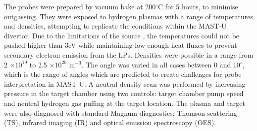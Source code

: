 \documentclass[a4paper, 12pt]{article} %
\begin{document}
	The probes were prepared by vacuum bake at 200$^{\circ}$C for 5 hours, to minimise outgassing. 
	They were exposed to hydrogen plasmas with a range of temperatures and densities, attempting to replicate the conditions within the MAST-U divertor.
	Due to the limitations of the source \cite{DeTemmerman2015a}, the temperatures could not be pushed higher than 3eV while maintaining low enough heat fluxes to prevent secondary electron emission from the LPs\cite{Stangeby2000}. 
	Densities were possible in a range from 2 $\times 10^{19}$ to 2.5 $\times 10^{20}$ m$^{-3}$.
	The angle was varied in all cases between 0 and 10$^{\circ}$, which is the range of angles which are predicted to create challenges for probe interpretation in MAST-U.
	A neutral density scan was performed by increasing pressure in the target chamber using two controls: target chamber pump speed and neutral hydrogen gas puffing at the target location.	
	The plasma and target were also diagnosed with standard Magnum diagnostics: Thomson scattering (TS), infrared imaging (IR) and optical emission spectroscopy (OES). 
	
\end{document}

